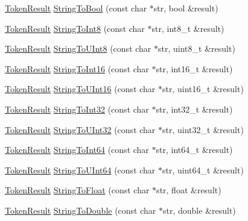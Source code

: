 \begin{DoxyCompactItemize}
\item 
\hyperlink{namespacemage_a2178ba2411db5912f41b2e7698c2037d}{Token\+Result} \hyperlink{namespacemage_a4936774f925ba96c5b8d37c5e54cca02}{String\+To\+Bool} (const char $\ast$str, bool \&result)
\item 
\hyperlink{namespacemage_a2178ba2411db5912f41b2e7698c2037d}{Token\+Result} \hyperlink{namespacemage_ab7990acb6c8fb8e5eb578ef173e601f9}{String\+To\+Int8} (const char $\ast$str, int8\+\_\+t \&result)
\item 
\hyperlink{namespacemage_a2178ba2411db5912f41b2e7698c2037d}{Token\+Result} \hyperlink{namespacemage_ad3cfd1fdffefa1f3f793b7612de11770}{String\+To\+U\+Int8} (const char $\ast$str, uint8\+\_\+t \&result)
\item 
\hyperlink{namespacemage_a2178ba2411db5912f41b2e7698c2037d}{Token\+Result} \hyperlink{namespacemage_a5889574dc8d73ffa614ad8541e0b312a}{String\+To\+Int16} (const char $\ast$str, int16\+\_\+t \&result)
\item 
\hyperlink{namespacemage_a2178ba2411db5912f41b2e7698c2037d}{Token\+Result} \hyperlink{namespacemage_aa1be9dbfa0799457b0de019d451cd5ca}{String\+To\+U\+Int16} (const char $\ast$str, uint16\+\_\+t \&result)
\item 
\hyperlink{namespacemage_a2178ba2411db5912f41b2e7698c2037d}{Token\+Result} \hyperlink{namespacemage_a805f1cf7436782f77b49085194451d07}{String\+To\+Int32} (const char $\ast$str, int32\+\_\+t \&result)
\item 
\hyperlink{namespacemage_a2178ba2411db5912f41b2e7698c2037d}{Token\+Result} \hyperlink{namespacemage_ac4f6357454f6870506e0fc102b745281}{String\+To\+U\+Int32} (const char $\ast$str, uint32\+\_\+t \&result)
\item 
\hyperlink{namespacemage_a2178ba2411db5912f41b2e7698c2037d}{Token\+Result} \hyperlink{namespacemage_a9134bbf3717893628e324fcf83e203a0}{String\+To\+Int64} (const char $\ast$str, int64\+\_\+t \&result)
\item 
\hyperlink{namespacemage_a2178ba2411db5912f41b2e7698c2037d}{Token\+Result} \hyperlink{namespacemage_a9ed31e3340a769a654f1f819c368bb6d}{String\+To\+U\+Int64} (const char $\ast$str, uint64\+\_\+t \&result)
\item 
\hyperlink{namespacemage_a2178ba2411db5912f41b2e7698c2037d}{Token\+Result} \hyperlink{namespacemage_a9353f738019573cfa93e504978bf6584}{String\+To\+Float} (const char $\ast$str, float \&result)
\item 
\hyperlink{namespacemage_a2178ba2411db5912f41b2e7698c2037d}{Token\+Result} \hyperlink{namespacemage_a49403be4dcbd136ffb13f62669576c50}{String\+To\+Double} (const char $\ast$str, double \&result)

\end{DoxyCompactItemize}
